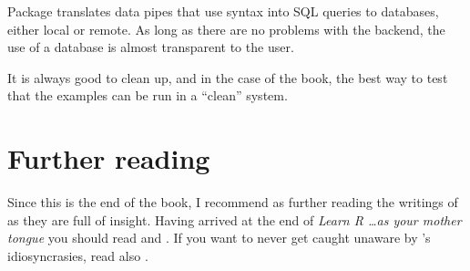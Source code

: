 \documentclass[krantz2]{krantz}\usepackage{knitr}
\begin{document}
\begin{explainbox}
Package  translates data pipes that use  syntax into SQL queries to databases, either local or remote. As long as there are no problems with the backend, the use of a database is almost transparent to the \Rlang user.
\end{explainbox}

\begin{infobox}
It is always good to clean up, and in the case of the book, the best way to test that the examples
can be run in a ``clean'' system.

\begin{knitrout}\footnotesize
{}\color{fgcolor}\begin{kframe}
\begin{alltt}
\hlstd{(}\hlstd{,}  \hlstd{=} \hlstd{)}
\hlstd{(}\hlstd{,}  \hlstd{=} \hlstd{)}
\end{alltt}
\end{kframe}
\end{knitrout}
\end{infobox}

\section{Further reading}
Since this is the end of the book, I recommend as further reading the writings of \citeauthor{Burns1998} as they are full of insight. Having arrived at the end of \emph{Learn R \ldots as your mother tongue} you should read  \autocite{Burns1998} and  \autocite{Burns2012}. If you want to never get caught unaware by \Rlang's idiosyncrasies, read also  \autocite{Burns2011}.





\backmatter

\printbibliography

\printindex

\printindex[rcatsidx]

\printindex[rindex]
\end{document}
